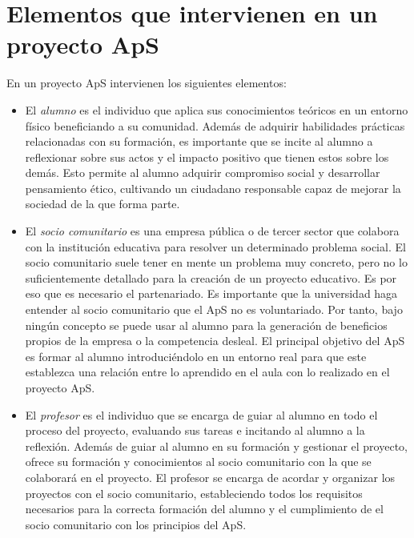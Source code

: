 \documentclass[11pt]{book}
\begin{document}
\section{Elementos que intervienen en un proyecto ApS}
En un proyecto ApS intervienen los siguientes elementos:
\begin{itemize} 
	\item El \emph{alumno} es el individuo que aplica sus conocimientos teóricos en un entorno físico beneficiando a su comunidad. Además de adquirir habilidades prácticas relacionadas con su formación, es importante que se incite al alumno a reflexionar sobre sus actos y el impacto positivo que tienen estos sobre los demás. Esto permite al alumno adquirir compromiso social y desarrollar pensamiento ético, cultivando un ciudadano responsable capaz de mejorar la sociedad de la que forma parte.
	
	\item El \emph{socio comunitario} es una empresa pública o de tercer sector que colabora con la institución educativa para resolver un determinado problema social. El socio comunitario suele tener en mente un problema muy concreto, pero no lo suficientemente detallado para la creación de un proyecto educativo. Es por eso que es necesario el partenariado. Es importante que la universidad haga entender al socio comunitario que el ApS no es voluntariado. Por tanto, bajo ningún concepto se puede usar al alumno para la generación de beneficios propios de la empresa o la competencia desleal. El principal objetivo del ApS es formar al alumno introduciéndolo en un entorno real para que este establezca una relación entre lo aprendido en el aula con lo realizado en el proyecto ApS.
	
	\item El \emph{profesor} es el individuo que se encarga de guiar al alumno en todo el proceso del proyecto, evaluando sus tareas e incitando al alumno a la reflexión. Además de guiar al alumno en su formación y gestionar el proyecto, ofrece su formación y conocimientos al socio comunitario con la que se colaborará en el proyecto. El profesor se encarga de acordar y organizar los proyectos con el socio comunitario, estableciendo todos los requisitos necesarios para la correcta formación del alumno y el cumplimiento de el socio comunitario con los principios del ApS.
	

\end{itemize}
\end{document}
